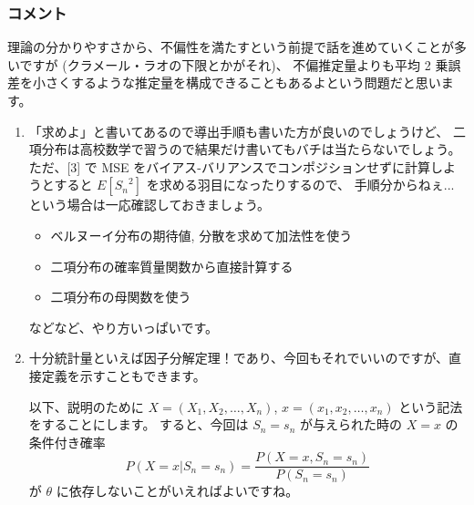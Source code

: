 \documentclass[./main.tex]{subfiles}
\begin{document}
    \subsubsection*{コメント}
    理論の分かりやすさから、不偏性を満たすという前提で話を進めていくことが多いですが (クラメール・ラオの下限とかがそれ)、
    不偏推定量よりも平均 2 乗誤差を小さくするような推定量を構成できることもあるよという問題だと思います。
    \begin{enumerate}
        \item 「求めよ」と書いてあるので導出手順も書いた方が良いのでしょうけど、
        二項分布は高校数学で習うので結果だけ書いてもバチは当たらないでしょう。
        ただ、[3] で MSE をバイアス-バリアンスでコンポジションせずに計算しようとすると $E[{S_n}^2]$ を求める羽目になったりするので、
        手順分からねぇ...という場合は一応確認しておきましょう。

        \begin{itemize}
            \item ベルヌーイ分布の期待値, 分散を求めて加法性を使う
            \item 二項分布の確率質量関数から直接計算する
            \item 二項分布の母関数を使う
        \end{itemize}
        などなど、やり方いっぱいです。

        \item 十分統計量といえば因子分解定理！であり、今回もそれでいいのですが、直接定義を示すこともできます。
        
        以下、説明のために $X = (X_1, X_2, \dots, X_n)$, $x = (x_1, x_2, \dots, x_n)$ という記法をすることにします。
        すると、今回は $S_n = s_n$ が与えられた時の $X = x$ の条件付き確率
        \begin{equation}
            P ( X = x \vert S_n = s_n)
                = \frac{P(X = x, S_n = s_n)}{P(S_n = s_n)}
                \label{eq:2024-suri-3-cond-prob}
        \end{equation}
        が $\theta$ に依存しないことがいえればよいですね。


\end{enumerate}
\end{document}
